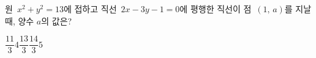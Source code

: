 원~$x^2+y^2=13$에 접하고 직선~$2x-3y-1=0$에 평행한 직선이 점~$(1,\,a)$를 지날 때, 양수 $a$의 값은?
\begin{choices32}{$\dfrac{11}{3}$}{$4$}{$\dfrac{13}{3}$}{$\dfrac{14}{3}$}{$5$}\end{choices32}
